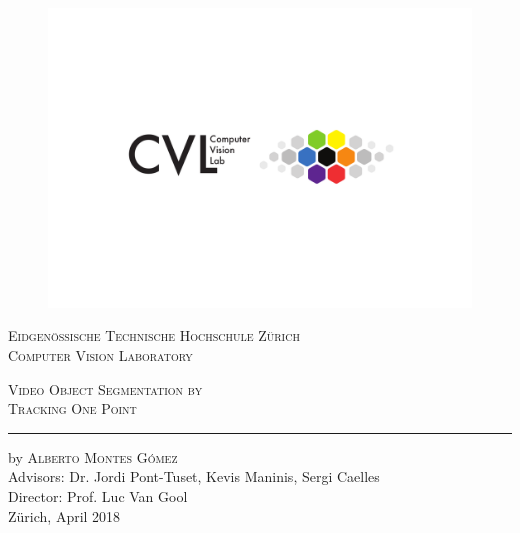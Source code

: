 
\begin{titlingpage}
\begin{center}

\begin{figure}
  \includegraphics[trim={0 6cm 0 4cm},clip,width=1\linewidth]{figures/cvl_logo.pdf}
\end{figure}

{\selectfont
\large{\textsc{Eidgen\"ossische Technische Hochschule Z\"urich\\[1mm]
Computer Vision Laboratory\\[25mm]}}

\huge{\textsc{Video Object Segmentation by \\ Tracking One Point}}
\vskip 0.5cm
\hrule
\vskip 2.6cm

\Large
by \textsc{Alberto Montes G\'omez}\\[2cm]

\large
Advisors:
Dr. Jordi Pont-Tuset,
Kevis Maninis,
Sergi Caelles
\\
Director:
Prof. Luc Van Gool
\\
Z\"urich,
April 2018}
\end{center}
\end{titlingpage}
